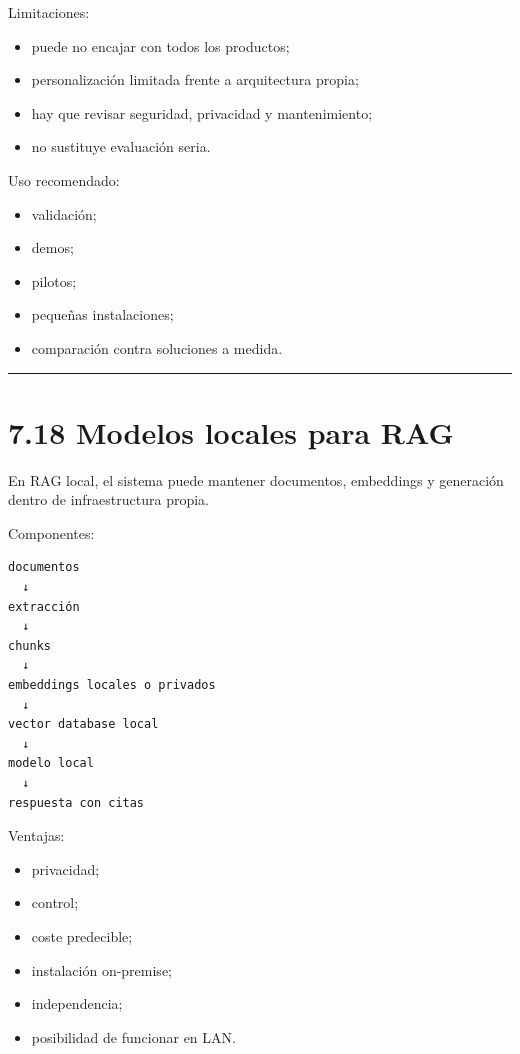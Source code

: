 Limitaciones:

\begin{itemize}
\tightlist
\item
  puede no encajar con todos los productos;
\item
  personalización limitada frente a arquitectura propia;
\item
  hay que revisar seguridad, privacidad y mantenimiento;
\item
  no sustituye evaluación seria.
\end{itemize}

Uso recomendado:

\begin{itemize}
\tightlist
\item
  validación;
\item
  demos;
\item
  pilotos;
\item
  pequeñas instalaciones;
\item
  comparación contra soluciones a medida.
\end{itemize}

\begin{center}\rule{0.5\linewidth}{0.5pt}\end{center}

\section{7.18 Modelos locales para RAG}\label{modelos-locales-para-rag}

En RAG local, el sistema puede mantener documentos, embeddings y
generación dentro de infraestructura propia.

Componentes:

\begin{lstlisting}
documentos
  ↓
extracción
  ↓
chunks
  ↓
embeddings locales o privados
  ↓
vector database local
  ↓
modelo local
  ↓
respuesta con citas
\end{lstlisting}

Ventajas:

\begin{itemize}
\tightlist
\item
  privacidad;
\item
  control;
\item
  coste predecible;
\item
  instalación on-premise;
\item
  independencia;
\item
  posibilidad de funcionar en LAN.
\end{itemize}

